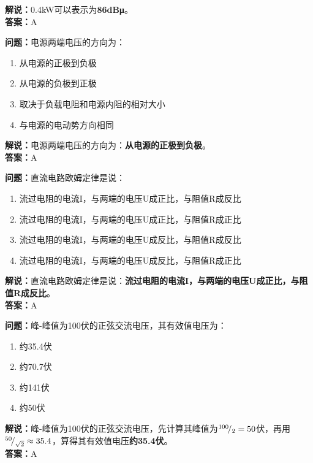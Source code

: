 \textbf{解说：}0.4kW可以表示为\textbf{86dBμ}。\\\textbf{答案：}A%



\textbf{问题：}电源两端电压的方向为：

\begin{enumerate}[label=\Alph*), leftmargin=1.5cm]
	\item 从电源的正极到负极
	\item 从电源的负极到正极
	\item 取决于负载电阻和电源内阻的相对大小
	\item 与电源的电动势方向相同
\end{enumerate}

\textbf{解说：}电源两端电压的方向为：\textbf{从电源的正极到负极}。\\\textbf{答案：}A



\textbf{问题：}直流电路欧姆定律是说：

\begin{enumerate}[label=\Alph*), leftmargin=1.5cm]
	\item 流过电阻的电流I，与两端的电压U成正比，与阻值R成反比
	\item 流过电阻的电流I，与两端的电压U成正比，与阻值R成正比
	\item 流过电阻的电流I，与两端的电压U成反比，与阻值R成反比
	\item 流过电阻的电流I，与两端的电压U成反比，与阻值R成正比
\end{enumerate}

\textbf{解说：}直流电路欧姆定律是说：\textbf{流过电阻的电流I，与两端的电压U成正比，与阻值R成反比}。\\\textbf{答案：}A%



\textbf{问题：}峰-峰值为100伏的正弦交流电压，其有效值电压为：

\begin{enumerate}[label=\Alph*), leftmargin=1.5cm]
	\item 约35.4伏
	\item 约70.7伏
	\item 约141伏
	\item 约50伏
\end{enumerate}

\textbf{解说：}峰-峰值为100伏的正弦交流电压，先计算其峰值为\({}^{100}\!/_{2}=50\)伏，再用\({}^{50}\!/_{\sqrt{2}}\approx35.4\)，算得其有效值电压\textbf{约35.4伏}。\\\textbf{答案：}A%



